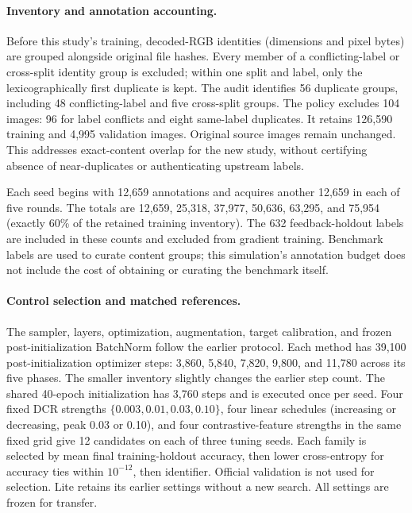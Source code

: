 \documentclass[10pt,a4paper,twocolumn]{article}
\begin{document}
\paragraph{Inventory and annotation accounting.}
Before this study's training, decoded-RGB identities (dimensions and
pixel bytes) are grouped alongside original file hashes. Every member
of a conflicting-label or cross-split identity group is excluded; within
one split and label, only the lexicographically first duplicate is kept.
The audit identifies 56 duplicate groups, including 48 conflicting-label
and five cross-split groups. The policy excludes 104 images: 96 for label
conflicts and eight same-label duplicates. It retains 126,590 training
and 4,995 validation images. Original source images remain unchanged.
This addresses exact-content overlap for the new study, without
certifying absence of near-duplicates or authenticating upstream labels.

Each seed begins with 12,659 annotations and acquires another 12,659
in each of five rounds. The totals are 12,659, 25,318, 37,977, 50,636,
63,295, and 75,954 (exactly 60\% of the retained training inventory).
The 632 feedback-holdout labels are included in these counts and
excluded from gradient training. Benchmark labels are used to curate
content groups; this simulation's annotation budget does not include
the cost of obtaining or curating the benchmark itself.

\paragraph{Control selection and matched references.}
The sampler, layers, optimization, augmentation, target calibration,
and frozen post-initialization BatchNorm follow the earlier protocol.
Each method has 39,100 post-initialization optimizer steps: 3,860,
5,840, 7,820, 9,800, and 11,780 across its five phases. The smaller
inventory slightly changes the earlier step count. The shared 40-epoch
initialization has 3,760 steps and is executed once per seed.
Four fixed DCR strengths $\{0.003,0.01,0.03,0.10\}$, four linear
schedules (increasing or decreasing, peak 0.03 or 0.10), and four
contrastive-feature strengths in the same fixed grid give 12 candidates
on each of three tuning seeds. Each family is selected by mean final
training-holdout accuracy, then lower cross-entropy for accuracy ties
within $10^{-12}$, then identifier. Official validation is not used for
selection. Lite retains its earlier settings without a new search.
All settings are frozen for transfer.
\end{document}
